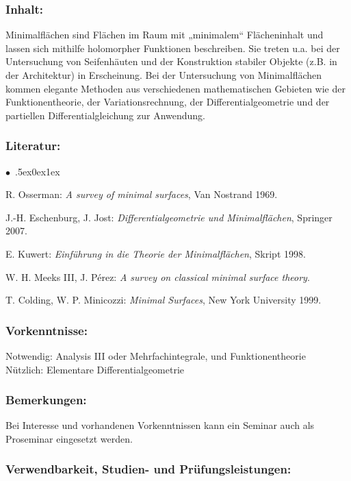 \documentclass[a4paper,10pt]{article}
\renewenvironment{itemize}{\begin{list}{$\bullet$\ }{\itemsep.5ex\setlength{\topsep}{0.5\itemsep}\parsep0ex\labelsep1ex\settowidth{\labelwidth}{$\bullet$\ }\setlength{\leftmargin}{\labelwidth}\addtolength{\leftmargin}{3ex}\addtolength{\leftmargin}{\labelsep}}}{\end{list}}
\begin{document}
\subsubsection*{\large
    Inhalt:
}
Minimalflächen sind Flächen im Raum mit „minimalem“ Flächeninhalt und lassen sich mithilfe holomorpher Funktionen beschreiben. Sie treten u.a. bei der Untersuchung von Seifenhäuten und der Konstruktion stabiler Objekte (z.B. in der Architektur) in Erscheinung. Bei der Untersuchung von Minimalflächen kommen elegante Methoden aus verschiedenen mathematischen Gebieten wie der Funktionentheorie, der Variationsrechnung, der Differentialgeometrie und der partiellen Differentialgleichung zur Anwendung.
\subsubsection*{\large
    Literatur:
}
\begin{itemize}
\item
R. Osserman: \emph{A survey of minimal surfaces}, Van Nostrand 1969. 
\item
J.-H. Eschenburg, J. Jost: \emph{Differentialgeometrie und Minimalflächen}, Springer 2007.
\item
E. Kuwert: \emph{Einführung in die Theorie der Minimalflächen}, Skript 1998.
\item
W. H. Meeks III, J. Pérez: \emph{A survey on classical minimal surface theory}.
\item
T. Colding, W. P. Minicozzi: \emph{Minimal Surfaces}, New York University 1999.
\end{itemize}
\subsubsection*{\large
    Vorkenntnisse:
}
Notwendig: Analysis III oder Mehrfachintegrale, und Funktionentheorie \\ Nützlich: Elementare Differentialgeometrie
\subsubsection*{\large
    Bemerkungen:
}
Bei Interesse und vorhandenen Vorkenntnissen kann ein Seminar auch als Proseminar eingesetzt werden.
\subsubsection*{\large
    Verwendbarkeit, Studien- und Prüfungsleistungen:
}
\end{document}
